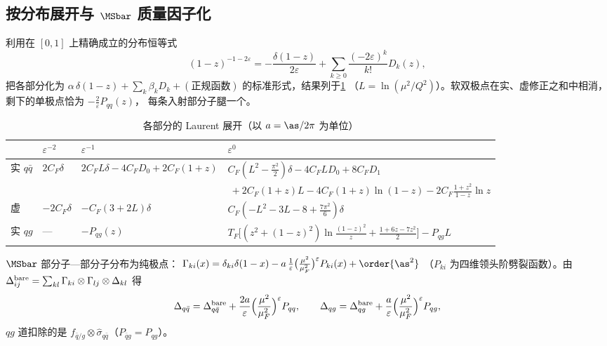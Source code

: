 \subsection{按分布展开与 \texorpdfstring{$\MSbar$}{MS-bar} 质量因子化}
\label{sec:dy1l-msbar}

利用在 $[0,1]$ 上精确成立的分布恒等式
\begin{equation}\label{eq:dy1l-expand}
(1-z)^{-1-2\varepsilon}=-\frac{\delta(1-z)}{2\varepsilon}+\sum_{k\ge0}\frac{(-2\varepsilon)^k}{k!}D_k(z),
\end{equation}
把各部分化为 $\alpha\,\delta(1-z)+\sum_k\beta_kD_k+(\text{正规函数})$ 的标准形式，结果列于\cref{tab:dy1l-laurent}
（$L=\ln(\mu^2/Q^2)$）。软双极点在实、虚修正之和中相消，剩下的单极点恰为 $-\frac{2}{\varepsilon}P_{qq}(z)$，
每条入射部分子腿一个。

\begin{table}[htbp]
\centering
\caption{各部分的 Laurent 展开（以 $a=\as/2\pi$ 为单位）}
\label{tab:dy1l-laurent}
\footnotesize
\setlength{\tabcolsep}{4pt}
\begin{tabular}{llll}
\toprule
 & $\varepsilon^{-2}$ & $\varepsilon^{-1}$ & $\varepsilon^{0}$\\
\midrule
实 $q\bar q$ & $2C_F\delta$ & $2C_FL\delta-4C_FD_0+2C_F(1+z)$ &
$C_F(L^2-\frac{\pi^2}{2})\delta-4C_FLD_0+8C_FD_1$\\
 & & & $\ +2C_F(1+z)L-4C_F(1+z)\ln(1-z)-2C_F\frac{1+z^2}{1-z}\ln z$\\
虚 & $-2C_F\delta$ & $-C_F(3+2L)\delta$ & $C_F(-L^2-3L-8+\frac{7\pi^2}{6})\delta$\\
实 $qg$ & --- & $-P_{qg}(z)$ & $T_F\big[(z^2+(1-z)^2)\ln\frac{(1-z)^2}{z}+\frac{1+6z-7z^2}{2}\big]-P_{qg}L$\\
\bottomrule
\end{tabular}
\end{table}

$\MSbar$ 部分子—部分子分布为纯极点：
$\Gamma_{ki}(x)=\delta_{ki}\delta(1-x)-a\,\frac{1}{\varepsilon}\big(\frac{\mu^2}{\mu_F^2}\big)^{\varepsilon}P_{ki}(x)+\order{\as^2}$
（$P_{ki}$ 为四维领头阶劈裂函数）。由 $\Delta^{\rm bare}_{ij}=\sum_{kl}\Gamma_{ki}\otimes\Gamma_{lj}\otimes\Delta_{kl}$ 得
\begin{equation}\label{eq:dy1l-mf}
\Delta_{q\bar q}=\Delta^{\rm bare}_{q\bar q}+\frac{2a}{\varepsilon}\Big(\frac{\mu^2}{\mu_F^2}\Big)^{\varepsilon}P_{qq},\qquad
\Delta_{qg}=\Delta^{\rm bare}_{qg}+\frac{a}{\varepsilon}\Big(\frac{\mu^2}{\mu_F^2}\Big)^{\varepsilon}P_{qg},
\end{equation}
$qg$ 道扣除的是 $f_{\bar q/g}\otimes\hat\sigma_{q\bar q}$（$P_{\bar qg}=P_{qg}$）。

